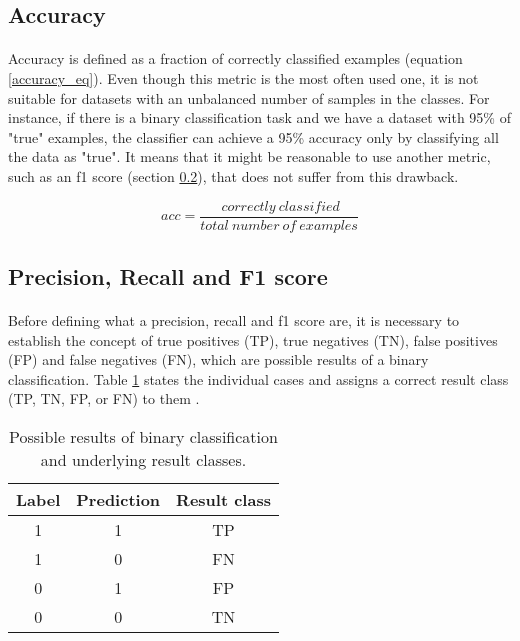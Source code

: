 \subsection{Accuracy}\label{accuracy}
\paragraph{}
Accuracy is defined as a fraction of correctly classified examples (equation \ref{accuracy_eq}). Even though this metric is the most often used one, it is not suitable for datasets with an unbalanced number of samples in the classes. For instance, if there is a binary classification task and we have a dataset with 95\% of "true" examples, the classifier can achieve a 95\% accuracy only by classifying all the data as "true". It means that it might be reasonable to use another metric, such as an f1 score (section \ref{f1_score}), that does not suffer from this drawback.

\begin{equation}
acc = \frac{\: correctly\: classified}{total\: number\: of\: examples}
\label{accuracy_eq}
\end{equation} 

\subsection{Precision, Recall and F1 score} \label{f1_score}
\paragraph{}
Before defining what a precision, recall and f1 score are, it is necessary to establish the concept of true positives (TP), true negatives (TN), false positives (FP) and false negatives (FN), which are possible results of a binary classification. Table \ref{result_classes_f1} states the individual cases and assigns a correct result class (TP, TN, FP, or FN) to them \cite{python_ml_2nd}. 

\begin{table}[h!]
	\centering
	\begin{tabular}{c c c} 
		\hline
		Label & Prediction & Result class \\ [0.5ex] 
		\hline\hline
		1 & 1 & TP \\ 
		1 & 0 & FN \\
		0 & 1 & FP \\
		0 & 0 & TN \\ [1ex] 
		\hline
	\end{tabular}
	\caption{Possible results of binary classification and underlying result classes.}
	\label{result_classes_f1}
\end{table}

